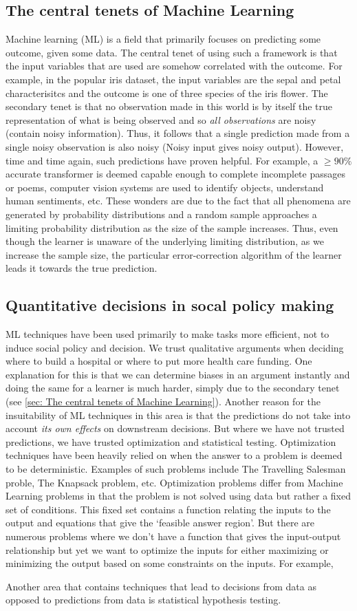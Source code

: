 \documentclass[12pt, letterpaper]{article}
\begin{document}
\subsection{The central tenets of Machine Learning}
\label{sec: The central tenets of Machine Learning}
Machine learning (ML) is a field that primarily focuses on predicting some outcome, given some data. The central
tenet of using such a framework is that the input variables that are used are somehow correlated 
with the outcome. For example, in the popular iris dataset, the input variables are the sepal and petal
characterisitcs and the outcome is one of three species of the iris flower. The secondary tenet is 
that no observation made in this world is by itself the true representation of what is being observed and 
so \textit{all observations} are noisy (contain noisy information). Thus, it follows that a single 
prediction made from a single noisy observation is also noisy (Noisy input gives noisy output). However,
time and time again, such predictions have proven helpful. For example, a $\geq90\%$ accurate transformer
is deemed capable enough to complete incomplete passages or poems, computer vision systems are used to 
identify objects, understand human sentiments, etc. These wonders are due to the fact that all phenomena
are generated by probability distributions and a random sample approaches a limiting probability
distribution as the size of the sample increases. Thus, even though the learner is unaware of the underlying 
limiting distribution, as we increase the sample size, the particular error-correction algorithm of the learner
leads it towards the true prediction. 

\subsection{Quantitative decisions in socal policy making}
ML techniques have been used primarily to make tasks more efficient, not to induce social policy and decision.
We trust qualitative arguments when deciding where to build a hospital or where to put more health care funding.
One explanation for this is that we can determine biases in an argument instantly and doing the same for 
a learner is much harder, simply due to the secondary tenet (see \ref{sec: The central tenets of Machine 
Learning}). Another reason for the insuitability of ML techniques in this area is that the predictions do 
not take into account \textit{its own effects} on downstream decisions. But where we have not trusted 
predictions, we have trusted optimization and statistical testing. Optimization techniques have been heavily 
relied on when the answer to a problem is deemed to be deterministic. Examples
of such problems include The Travelling Salesman proble, The Knapsack problem, etc. Optimization problems
differ from Machine Learning problems in that the problem is not solved using data but rather a fixed set 
of conditions. This fixed set contains a function relating the inputs to the output and equations that 
give the `feasible answer region'. But there are numerous problems where we don't have a function that 
gives the input-output relationship but yet we want to optimize the inputs for either maximizing or minimizing
the output based on some constraints on the inputs. For example, 

Another area that contains techniques that lead to decisions from data as opposed to predictions from data 
is statistical hypothesis testing.
\end{document}
